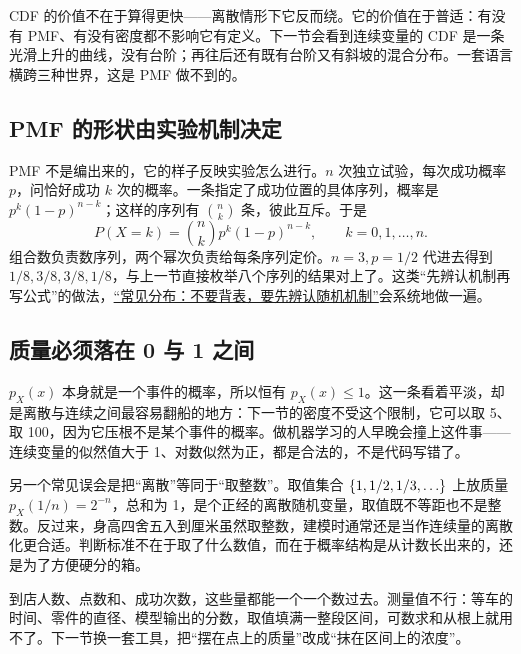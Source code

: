 CDF 的价值不在于算得更快——离散情形下它反而绕。它的价值在于普适：有没有 PMF、有没有密度都不影响它有定义。下一节会看到连续变量的 CDF 是一条光滑上升的曲线，没有台阶；再往后还有既有台阶又有斜坡的混合分布。一套语言横跨三种世界，这是 PMF 做不到的。

\subsection{PMF 的形状由实验机制决定}

PMF 不是编出来的，它的样子反映实验怎么进行。\(n\) 次独立试验，每次成功概率 \(p\)，问恰好成功 \(k\) 次的概率。一条指定了成功位置的具体序列，概率是 \(p^k(1-p)^{n-k}\)；这样的序列有 \(\binom nk\) 条，彼此互斥。于是
\[
P(X=k)=\binom nk p^k(1-p)^{n-k},\qquad k=0,1,\ldots,n.
\]
组合数负责数序列，两个幂次负责给每条序列定价。\(n=3,p=1/2\) 代进去得到 \(1/8,3/8,3/8,1/8\)，与上一节直接枚举八个序列的结果对上了。这类``先辨认机制再写公式''的做法，\hyperref[ch:042]{``常见分布：不要背表，要先辨认随机机制''}会系统地做一遍。

\subsection{质量必须落在 0 与 1 之间}

\(p_X(x)\) 本身就是一个事件的概率，所以恒有 \(p_X(x)\le1\)。这一条看着平淡，却是离散与连续之间最容易翻船的地方：下一节的密度不受这个限制，它可以取 5、取 100，因为它压根不是某个事件的概率。做机器学习的人早晚会撞上这件事——连续变量的似然值大于 1、对数似然为正，都是合法的，不是代码写错了。

另一个常见误会是把``离散''等同于``取整数''。取值集合 \(\left\{1,1/2,1/3,\ldots\right\}\) 上放质量 \(p_X(1/n)=2^{-n}\)，总和为 1，是个正经的离散随机变量，取值既不等距也不是整数。反过来，身高四舍五入到厘米虽然取整数，建模时通常还是当作连续量的离散化更合适。判断标准不在于取了什么数值，而在于概率结构是从计数长出来的，还是为了方便硬分的箱。

到店人数、点数和、成功次数，这些量都能一个一个数过去。测量值不行：等车的时间、零件的直径、模型输出的分数，取值填满一整段区间，可数求和从根上就用不了。下一节换一套工具，把``摆在点上的质量''改成``抹在区间上的浓度''。
